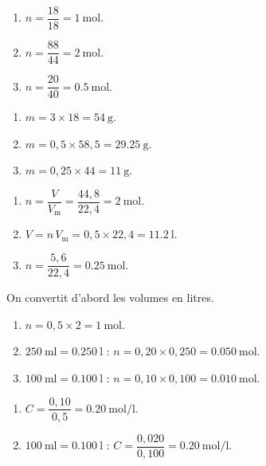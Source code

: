 \documentclass[11pt,a4paper]{article}
\begin{document}
\begin{corrige}
\begin{enumerate}[label=\alph*)]
  \item $n=\dfrac{18}{18}=\qty{1}{\mole}.$
  \item $n=\dfrac{88}{44}=\qty{2}{\mole}.$
  \item $n=\dfrac{20}{40}=\qty{0.5}{\mole}.$
\end{enumerate}
\end{corrige}

\begin{corrige}
\begin{enumerate}[label=\alph*)]
  \item $m=3\times18=\qty{54}{\gram}.$
  \item $m=0,5\times58,5=\qty{29.25}{\gram}.$
  \item $m=0,25\times44=\qty{11}{\gram}.$
\end{enumerate}
\end{corrige}

\begin{corrige}
\begin{enumerate}[label=\alph*)]
  \item $n=\dfrac{V}{V_{\mathrm{m}}}=\dfrac{44,8}{22,4}=\qty{2}{\mole}.$
  \item $V=n\,V_{\mathrm{m}}=0,5\times22,4=\qty{11.2}{\litre}.$
  \item $n=\dfrac{5,6}{22,4}=\qty{0.25}{\mole}.$
\end{enumerate}
\end{corrige}

\begin{corrige}
On convertit d'abord les volumes en litres.
\begin{enumerate}[label=\alph*)]
  \item $n=0,5\times2=\qty{1}{\mole}.$
  \item $\qty{250}{\milli\litre}=\qty{0.250}{\litre}$ : $n=0,20\times0,250=\qty{0.050}{\mole}.$
  \item $\qty{100}{\milli\litre}=\qty{0.100}{\litre}$ : $n=0,10\times0,100=\qty{0.010}{\mole}.$
\end{enumerate}
\end{corrige}

\begin{corrige}
\begin{enumerate}[label=\alph*)]
  \item $C=\dfrac{0,10}{0,5}=\qty{0.20}{\mole\per\litre}.$
  \item $\qty{100}{\milli\litre}=\qty{0.100}{\litre}$ : $C=\dfrac{0,020}{0,100}=\qty{0.20}{\mole\per\litre}.$
\end{enumerate}
\end{corrige}
\end{document}
